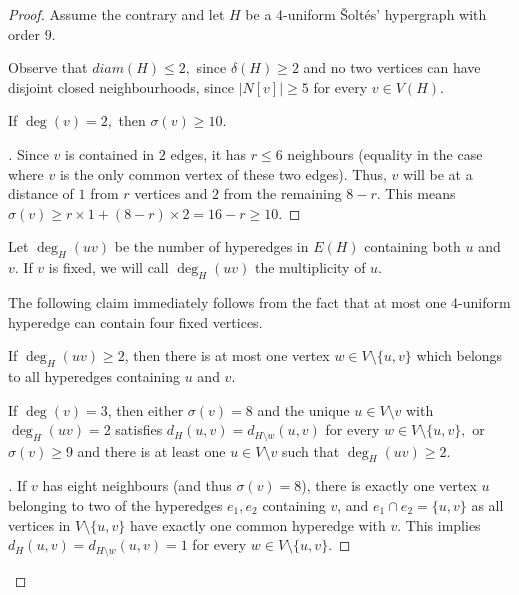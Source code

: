 \documentclass[10pt,a4paper]{amsart}
\newcommand*{\abs}[1]{\lvert #1\rvert}
\newenvironment{claimproof}[1][\myproofname]{\begin{proof}[#1]\renewcommand*{\qedsymbol}{\(\diamondsuit\)}}{\end{proof}}
\newcommand{\diam}{diam}
\begin{document}
\begin{proof}
    Assume the contrary and let $H$ be a $4$-uniform \v Solt\'es' hypergraph with order $9$.

    Observe that $\diam(H)\le 2,$ since $\delta(H)\ge 2$ and no two vertices can have disjoint closed neighbourhoods, since $\abs{N[v]}\ge 5$ for every $v\in V(H).$ 


    \begin{claim}\label{clm:claimdeg2}
        If $\deg(v)=2,$ then $\sigma(v)\ge 10$. 
    \end{claim}
    \begin{claimproof}
        Since $v$ is contained in $2$ edges, it has $r \le 6$ neighbours (equality in the case where $v$ is the only common vertex of these two edges). Thus, $v$ will be at a distance of $1$ from $r$ vertices and $2$ from the remaining $8-r$. This means $\sigma(v)\ge r\times 1+(8-r)\times2=16-r \ge 10$.
    \end{claimproof}

    Let $\deg_H(uv)$ be the number of hyperedges in $E(H)$ containing both $u$ and $v$. If $v$ is fixed, we will call $\deg_H(uv)$ the multiplicity of $u$.

    
    The following claim immediately follows from the fact that at most one $4$-uniform hyperedge can contain four fixed vertices.

\begin{claim}\label{clm:deg(uv)gexuv-1}
    If $\deg_H(uv)\ge 2$, then there is at most one vertex $w \in V \setminus \{u,v\}$ which belongs to all hyperedges containing $u$ and $v$.
\end{claim}

    \begin{claim}\label{clm:claimdeg3}
        If $\deg(v)=3$, then either $\sigma(v)=8$ and the unique $u \in V \setminus v$ with $\deg_H(uv)= 2$ satisfies $d_H(u,v)=d_{H \setminus w}(u,v)$ for every $w \in V \setminus \{u,v\},$ or $\sigma(v)\ge 9$ and there is at least one $u \in V \setminus v$ such that $\deg_H(uv)\ge 2$.
    \end{claim}
    \begin{claimproof}
        If $v$ has eight neighbours (and thus $\sigma(v)=8$), there is exactly one vertex $u$ belonging to two of the hyperedges $e_1, e_2$ containing $v$, and $e_1 \cap e_2 =\{u,v\}$ as all vertices in $V \setminus \{u,v\}$ have exactly one common hyperedge with $v$. This implies $d_H(u,v)=d_{H \setminus w}(u,v)=1$ for every $w \in V \setminus \{u,v\}.$


\end{claimproof}
\end{proof}
\end{document}
